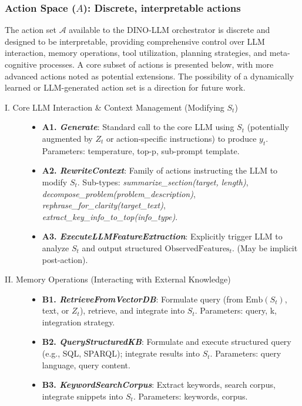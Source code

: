 \documentclass[11pt]{article}
\begin{document}
\subsubsection{Action Space ($A$): Discrete, interpretable actions}
\label{sssec:mdp_actions}
The action set $\mathcal{A}$ available to the DINO-LLM orchestrator is discrete and designed to be interpretable, providing comprehensive control over LLM interaction, memory operations, tool utilization, planning strategies, and meta-cognitive processes. A core subset of actions is presented below, with more advanced actions noted as potential extensions. The possibility of a dynamically learned or LLM-generated action set is a direction for future work.

\begin{description}
    \item[I. Core LLM Interaction \& Context Management (Modifying $S_t$)]
        \begin{itemize}
            \item \textbf{A1. \emph{Generate}}: Standard call to the core LLM using $S_t$ (potentially augmented by $Z_t$ or action-specific instructions) to produce $y_t$. Parameters: temperature, top-p, sub-prompt template.
            \item \textbf{A2. \emph{RewriteContext}}: Family of actions instructing the LLM to modify $S_t$. Sub-types: \emph{summarize_section(target, length)}, \emph{decompose_problem(problem_description)}, \emph{rephrase_for_clarity(target_text)}, \emph{extract_key_info_to_top(info_type)}.
            \item \textbf{A3. \emph{ExecuteLLMFeatureExtraction}}: Explicitly trigger LLM to analyze $S_t$ and output structured $\text{ObservedFeatures}_t$. (May be implicit post-action).
        \end{itemize}
    \item[II. Memory Operations (Interacting with External Knowledge)]
        \begin{itemize}
            \item \textbf{B1. \emph{RetrieveFromVectorDB}}: Formulate query (from $\text{Emb}(S_t)$, text, or $Z_t$), retrieve, and integrate into $S_t$. Parameters: query, k, integration strategy.
            \item \textbf{B2. \emph{QueryStructuredKB}}: Formulate and execute structured query (e.g., SQL, SPARQL); integrate results into $S_t$. Parameters: query language, query content.
            \item \textbf{B3. \emph{KeywordSearchCorpus}}: Extract keywords, search corpus, integrate snippets into $S_t$. Parameters: keywords, corpus.

\end{itemize}
\end{description}
\end{document}
